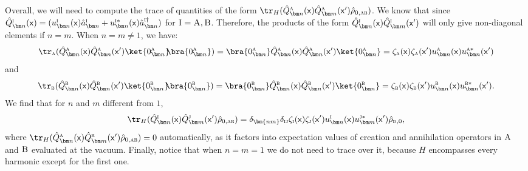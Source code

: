 \documentclass[letterpaper,12pt,titlepage,oneside,final]{book}
\newcommand{\mf}{\mathsf}%
\newcommand{\tc}[1]{\textsc{#1}}
\begin{document}
{Overall, we will need to compute the trace of quantities of the form $\tr_H(\hat{Q}^\tc{a}_{\bm n}(\mf x)\hat{Q}^\tc{a}_{\bm m}(\mf x')\hat{\rho}_{0,\tc{ab}})$. We know that since $\hat{Q}^\tc{i}_{\bm n}(\mf x) = (u_{\bm n}^{\tc{i}}(\mf x)\hat{a}_{\bm n}^\tc{i} + u_{\bm n}^{\tc{i}*}(\mf x)\hat{a}^{\tc{i}\dagger}_{\bm n})$ for $\tc{I} = \tc{A},\tc{B}$. Therefore, the products of the form $\hat{Q}^\tc{i}_{\bm n}(\mf x)\hat{Q}_{\bm m}^\tc{i}(\mf x')$ will only give non-diagonal elements if $n = m$. When $n= m \neq 1$, we have:
\begin{equation}
    \tr_\tc{a}(\hat{Q}^\tc{a}_{\bm n}(\mf x)\hat{Q}^\tc{a}_{\bm n}(\mf x')\ket{0^\tc{a}_{\bm n}}\!\!\bra{0^\tc{a}_{\bm n}}) = \bra{0_{\bm n}^\tc{a}}\hat{Q}^\tc{a}_{\bm n}(\mf x)\hat{Q}^\tc{a}_{\bm n}(\mf x')\ket{0_{\bm n}^\tc{a}} = \zeta_\tc{a}(\mf x)\zeta_\tc{a}(\mf x')u_{\bm n}^\tc{a}(\mf x) u_{\bm n}^{\tc{a}*}(\mf x')
\end{equation}
and
\begin{equation}
    \tr_\tc{b}(\hat{Q}^\tc{b}_{\bm n}(\mf x)\hat{Q}^\tc{b}_{\bm n}(\mf x')\ket{0^\tc{b}_{\bm n}}\!\!\bra{0^\tc{b}_{\bm n}}) = \bra{0_{\bm n}^\tc{b}}\hat{Q}^\tc{b}_{\bm n}(\mf x)\hat{Q}^\tc{b}_{\bm n}(\mf x')\ket{0_{\bm n}^\tc{b}} = \zeta_\tc{b}(\mf x) \zeta_\tc{b}(\mf x')u_{\bm n}^\tc{b}(\mf x) u_{\bm n}^{\tc{b}*}(\mf x').
\end{equation}
We find that for $n$ and $m$ different from $1$,
\begin{equation}
    \tr_H(\hat{Q}_{\bm n}^\tc{i}(\mf x)\hat{Q}_{\bm m}^\tc{j}(\mf x')\hat{\rho}_{0,\tc{ab}}) = \delta_{\bm{nm}} \delta_{\tc{i}\tc{j}} \zeta_\tc{i}(\mf x)\zeta_\tc{j}(\mf x')u_{\bm n}^{\tc{i}}(\mf x)u_{\bm m}^{\tc{j}*}(\mf x')\hat{\rho}_{\tc{d},0},
\end{equation}
where $\tr_H(\hat{Q}_{\bm n}^\tc{a}(\mf x)\hat{Q}_{\bm m}^\tc{b}(\mf x')\hat{\rho}_{0,\tc{ab}}) = 0$ automatically, as it factors into expectation values of creation and annihilation operators in $\tc{A}$ and $\tc{B}$ evaluated at the vacuum. Finally, notice that when $n = m = 1$ we do not need to trace over it, because $H$ encompasses every harmonic except for the first one.

}
\end{document}
